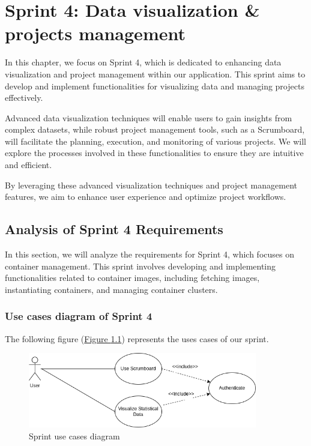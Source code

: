 \chapter{Sprint 4: Data visualization \& projects management}
In this chapter, we focus on Sprint 4, which is dedicated to enhancing data visualization and project management within our application. This sprint aims to develop and implement functionalities for visualizing data and managing projects effectively.

Advanced data visualization techniques will enable users to gain insights from complex datasets, while robust project management tools, such as a Scrumboard, will facilitate the planning, execution, and monitoring of various projects. We will explore the processes involved in these functionalities to ensure they are intuitive and efficient. 

By leveraging these advanced visualization techniques and project management features, we aim to enhance user experience and optimize project workflows.
\pagebreak

\section{Analysis of Sprint 4 Requirements}
In this section, we will analyze the requirements for Sprint 4, which focuses on container management. This sprint involves developing and implementing functionalities related to container images, including fetching images, instantiating containers, and managing container clusters. 

\subsection{Use cases diagram of Sprint 4}

The following figure (\hyperref[fig:sprint_use_cases4]{Figure \ref{fig:sprint_use_cases4}})  represents the uses cases of our sprint.
\begin{figure}[h]
  \center
  \includegraphics[width=10cm]{./chapters/sprint4/sprint_use_cases.png}
  \caption{Sprint use cases diagram}
  \label{fig:sprint_use_cases4}
\end{figure}

